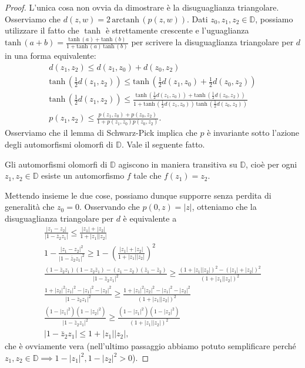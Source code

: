 \begin{proof}
  L'unica cosa non ovvia da dimostrare è la disuguaglianza triangolare. Osserviamo che $d(z,w)=2\,\text{arctanh}\,(p(z,w))$. Dati $z_0, z_1, z_2 \in \mathbb{D}$, possiamo utilizzare il fatto che $\tanh$ è strettamente crescente e l'uguaglianza $\text{tanh}\,(a+b)=\frac{\text{tanh}\,(a)+\text{tanh}\,(b)}{1+\text{tanh}\,(a)\,\text{tanh}\,(b)}$ per scrivere la disuguaglianza triangolare per $d$ in una forma equivalente:
  \begin{align*}
    d(z_1, z_2) \le d(z_1, z_0)+d(z_0,z_2) \\
    \text{tanh}\,\left(\frac{1}{2}d(z_1,z_2)\right) \le \text{tanh}\,\left(\frac{1}{2}d(z_1, z_0)+\frac{1}{2}d(z_0,z_2)\right) \\
    \text{tanh}\,\left(\frac{1}{2}d(z_1,z_2)\right) \le \frac{\text{tanh}\,(\frac{1}{2}d(z_1, z_0))+\text{tanh}\,(\frac{1}{2}d(z_0,z_2))}{1+\text{tanh}\,(\frac{1}{2}d(z_1, z_0))\,\text{tanh}\,(\frac{1}{2}d(z_0,z_2))} \\
    p(z_1,z_2) \le \frac{p(z_1,z_0)+p(z_0,z_2)}{1+p(z_1,z_0)p(z_0,z_2)}.
  \end{align*}
  Osserviamo che il lemma di Schwarz-Pick implica che $p$ è invariante sotto l'azione degli automorfismi olomorfi di $\mathbb{D}$. Vale il seguente fatto.

  \begin{ftt}
    Gli automorfismi olomorfi di $\mathbb{D}$ agiscono in maniera transitiva su $\mathbb{D}$, cioè per ogni $z_1, z_2 \in \mathbb{D}$ esiste un automorfismo $f$ tale che $f(z_1)=z_2$.
  \end{ftt}

  Mettendo insieme le due cose, possiamo dunque supporre senza perdita di generalità che $z_0=0$. Osservando che $p(0,z)=|z|$, otteniamo che la disuguaglianza triangolare per $d$ è equivalente a
  \begin{gather*}
    \frac{|z_1-z_2|}{|1-\bar{z}_2z_1|} \le \frac{|z_1|+|z_2|}{1+|z_1||z_2|} \\
    1-\frac{|z_1-z_2|^2}{|1-\bar{z}_2z_1|^2} \ge 1-\left(\frac{|z_1|+|z_2|}{1+|z_1||z_2|}\right)^2 \\
    \frac{(1-\bar{z}_2z_1)(1-z_2\bar{z}_1)-(z_1-z_2)(\bar{z}_1-\bar{z}_2)}{|1-\bar{z}_2z_1|^2} \ge \frac{(1+|z_1||z_2|)^2-(|z_1|+|z_2|)^2}{(1+|z_1||z_2|)^2} \\
    \frac{1+|z_2|^2|z_1|^2-|z_1|^2-|z_2|^2}{|1-\bar{z}_2z_1|^2} \ge \frac{1+|z_1|^2|z_2|^2-|z_1|^2-|z_2|^2}{(1+|z_1||z_2|)^2} \\
    \frac{(1-|z_1|^2)(1-|z_2|^2)}{|1-\bar{z}_2z_1|^2} \ge \frac{(1-|z_1|^2)(1-|z_2|^2)}{(1+|z_1||z_2|)^2} \\
    |1-\bar{z}_2z_1| \le 1+|z_1||z_2|,
  \end{gather*}
  che è ovviamente vera (nell'ultimo passaggio abbiamo potuto semplificare perché $z_1, z_2 \in \mathbb{D} \implies 1-|z_1|^2, 1-|z_2|^2>0$).
\end{proof}

